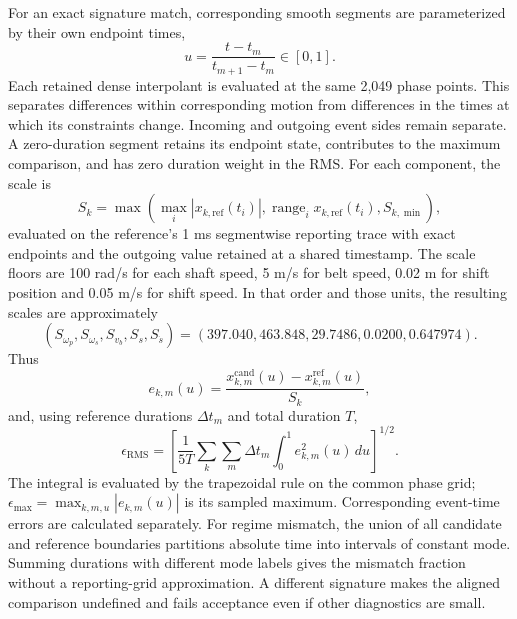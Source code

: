 \documentclass[11pt]{report}
\numberwithin{equation}{section}
\begin{document}
For an exact signature match, corresponding smooth segments are parameterized
by their own endpoint times,
\begin{equation}
u=\frac{t-t_m}{t_{m+1}-t_m}\in[0,1].
\label{eq:solver_event_aligned_phase}
\end{equation}
Each retained dense interpolant is evaluated at the same 2,049 phase points.
This separates differences within corresponding motion from differences in
the times at which its constraints change.
Incoming and outgoing event sides remain separate. A zero-duration segment
retains its endpoint state, contributes to the maximum comparison, and has
zero duration weight in the RMS. For each component, the scale is
\begin{equation}
S_k=\max\!\left(\max_i|x_{k,\mathrm{ref}}(t_i)|,
\operatorname{range}_i x_{k,\mathrm{ref}}(t_i),S_{k,\min}\right),
\label{eq:solver_state_scale}
\end{equation}
evaluated on the reference's 1 ms segmentwise reporting trace with exact
endpoints and the outgoing value retained at a shared timestamp. The scale
floors are 100 rad/s for each shaft speed, 5 m/s for belt speed, 0.02 m for
shift position and 0.05 m/s for shift speed. In that order and those units,
the resulting scales are approximately
\[
(S_{\omega_p},S_{\omega_s},S_{v_b},S_s,S_{\dot s})
=(397.040,463.848,29.7486,0.0200,0.647974).
\]
Thus
\begin{equation}
e_{k,m}(u)=\frac{x_{k,m}^{\mathrm{cand}}(u)-x_{k,m}^{\mathrm{ref}}(u)}{S_k},
\label{eq:solver_normalized_state_error}
\end{equation}
and, using reference durations $\Delta t_m$ and total duration $T$,
\begin{equation}
\epsilon_{\mathrm{RMS}}=
\left[\frac{1}{5T}\sum_k\sum_m\Delta t_m
\int_0^1 e_{k,m}^2(u)\,du\right]^{1/2}.
\label{eq:solver_event_aligned_rms}
\end{equation}
The integral is evaluated by the trapezoidal rule on the common phase grid;
$\epsilon_{\max}=\max_{k,m,u}|e_{k,m}(u)|$ is its sampled maximum.
Corresponding event-time errors are calculated separately. For regime
mismatch, the union of all candidate and reference boundaries partitions
absolute time into intervals of constant mode. Summing durations with
different mode labels gives the mismatch fraction without a reporting-grid
approximation. A different signature makes the aligned comparison undefined
and fails acceptance even if other diagnostics are small.
\end{document}
